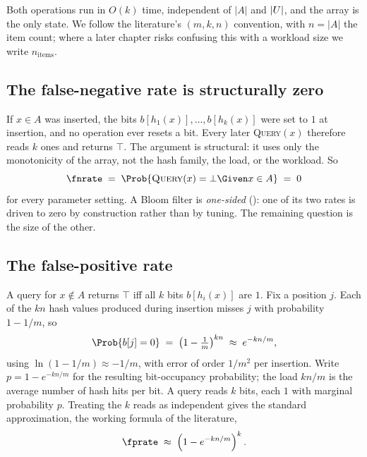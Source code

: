 Both operations run in $O(k)$ time, independent of $|A|$ and $|U|$,
and the array is the only state. We follow the literature's $(m, k, n)$
convention, with $n = |A|$ the item count; where a later chapter risks
confusing this with a workload size we write $n_{\text{items}}$.

\begin{algorithm}[ht]
  \caption{Bloom filter insert and query}
  \label{alg:bloom-insert-query}

  \BlankLine
\end{algorithm}

\subsection*{The false-negative rate is structurally zero}

If $x \in A$ was inserted, the bits $b[h_1(x)], \ldots, b[h_k(x)]$ were set
to $1$ at insertion, and no operation ever resets a bit. Every later
\textsc{Query}$(x)$ therefore reads $k$ ones and returns $\top$. The
argument is structural: it uses only the monotonicity of the array, not
the hash family, the load, or the workload. So
\[
  \fnrate \;=\; \Prob{\textsc{Query}(x) = \bot \Given x \in A} \;=\; 0
\]
for every parameter setting. A Bloom filter is \emph{one-sided}
(): one of its two rates is driven to zero by
construction rather than by tuning. The remaining question is the size of
the other.

\subsection*{The false-positive rate}

A query for $x \notin A$ returns $\top$ iff all $k$ bits $b[h_i(x)]$ are
$1$. Fix a position $j$. Each of the $kn$ hash values produced during
insertion misses $j$ with probability $1 - 1/m$, so
\[
  \Prob{b[j] = 0} \;=\; \left(1 - \tfrac{1}{m}\right)^{kn} \;\approx\; e^{-kn/m},
\]
using $\ln(1 - 1/m) \approx -1/m$, with error of order $1/m^2$ per
insertion. Write $p = 1 - e^{-kn/m}$ for the resulting bit-occupancy
probability; the load $kn/m$ is the average number of hash hits per bit. A
query reads $k$ bits, each $1$ with marginal probability $p$. Treating the
$k$ reads as independent gives the standard approximation, the working
formula of the literature,
\begin{equation}
  \fprate \;\approx\; \left(1 - e^{-kn/m}\right)^k.
  \label{eq:bloom-fpr}
\end{equation}

